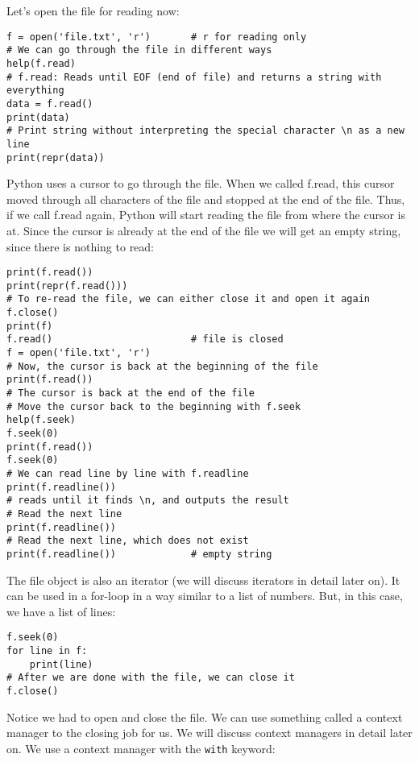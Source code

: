 \documentclass[12pt, a4paper]{article}
\begin{document}
Let's open the file for reading now:
\lstset{language=jupyter-python,label= ,caption= ,captionpos=b,numbers=none}
\begin{lstlisting}
f = open('file.txt', 'r')       # r for reading only
# We can go through the file in different ways
help(f.read)
# f.read: Reads until EOF (end of file) and returns a string with everything
data = f.read()
print(data)
# Print string without interpreting the special character \n as a new line
print(repr(data))
\end{lstlisting}
Python uses a cursor to go through the file.
When we called f.read, this cursor moved through all characters of the file and stopped at the end of the file.
Thus, if we call f.read again, Python will start reading the file from where the cursor is at. Since the cursor is already at the end of the file we will get an empty string, since there is nothing to read:
\lstset{language=jupyter-python,label= ,caption= ,captionpos=b,numbers=none}
\begin{lstlisting}
print(f.read())
print(repr(f.read()))
# To re-read the file, we can either close it and open it again
f.close()
print(f)
f.read()                        # file is closed
f = open('file.txt', 'r')
# Now, the cursor is back at the beginning of the file
print(f.read())
# The cursor is back at the end of the file
# Move the cursor back to the beginning with f.seek
help(f.seek)
f.seek(0)
print(f.read())
f.seek(0)
# We can read line by line with f.readline
print(f.readline())
# reads until it finds \n, and outputs the result
# Read the next line
print(f.readline())
# Read the next line, which does not exist
print(f.readline())             # empty string
\end{lstlisting}
The file object is also an iterator (we will discuss iterators in detail later on).
It can be used in a for-loop in a way similar to a list of numbers.
But, in this case, we have a list of lines:
\lstset{language=jupyter-python,label= ,caption= ,captionpos=b,numbers=none}
\begin{lstlisting}
f.seek(0)
for line in f:
    print(line)
# After we are done with the file, we can close it
f.close()
\end{lstlisting}
Notice we had to open and close the file.
We can use something called a context manager to the closing job for us.
We will discuss context managers in detail later on.
We use a context manager with the \texttt{with} keyword:
\lstset{language=jupyter-python,label= ,caption= ,captionpos=b,numbers=none}
\end{document}
